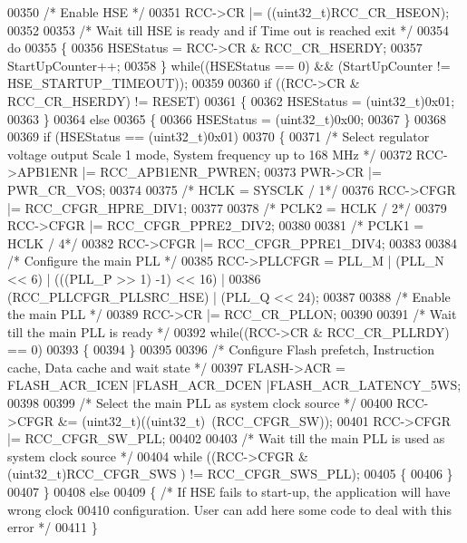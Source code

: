 \begin{DoxyCode}
00350   \textcolor{comment}{/* Enable HSE */}
00351   RCC->CR |= ((uint32\_t)RCC_CR_HSEON);
00352 
00353   \textcolor{comment}{/* Wait till HSE is ready and if Time out is reached exit */}
00354   \textcolor{keywordflow}{do}
00355   \{
00356     HSEStatus = RCC->CR & RCC_CR_HSERDY;
00357     StartUpCounter++;
00358   \} \textcolor{keywordflow}{while}((HSEStatus == 0) && (StartUpCounter != HSE_STARTUP_TIMEOUT));
00359 
00360   \textcolor{keywordflow}{if} ((RCC->CR & RCC_CR_HSERDY) != RESET)
00361   \{
00362     HSEStatus = (uint32\_t)0x01;
00363   \}
00364   \textcolor{keywordflow}{else}
00365   \{
00366     HSEStatus = (uint32\_t)0x00;
00367   \}
00368 
00369   \textcolor{keywordflow}{if} (HSEStatus == (uint32\_t)0x01)
00370   \{
00371     \textcolor{comment}{/* Select regulator voltage output Scale 1 mode, System frequency up to 168 MHz */}
00372     RCC->APB1ENR |= RCC_APB1ENR_PWREN;
00373     PWR->CR |= PWR_CR_VOS;
00374 
00375     \textcolor{comment}{/* HCLK = SYSCLK / 1*/}
00376     RCC->CFGR |= RCC_CFGR_HPRE_DIV1;
00377 
00378     \textcolor{comment}{/* PCLK2 = HCLK / 2*/}
00379     RCC->CFGR |= RCC_CFGR_PPRE2_DIV2;
00380 
00381     \textcolor{comment}{/* PCLK1 = HCLK / 4*/}
00382     RCC->CFGR |= RCC_CFGR_PPRE1_DIV4;
00383 
00384     \textcolor{comment}{/* Configure the main PLL */}
00385     RCC->PLLCFGR = PLL_M | (PLL_N << 6) | (((PLL_P >> 1) -1) << 16) |
00386                    (RCC_PLLCFGR_PLLSRC_HSE) | (PLL_Q << 24);
00387 
00388     \textcolor{comment}{/* Enable the main PLL */}
00389     RCC->CR |= RCC_CR_PLLON;
00390 
00391     \textcolor{comment}{/* Wait till the main PLL is ready */}
00392     \textcolor{keywordflow}{while}((RCC->CR & RCC_CR_PLLRDY) == 0)
00393     \{
00394     \}
00395 
00396     \textcolor{comment}{/* Configure Flash prefetch, Instruction cache, Data cache and wait state */}
00397     FLASH->ACR = FLASH_ACR_ICEN |FLASH_ACR_DCEN |FLASH_ACR_LATENCY_5WS;
00398 
00399     \textcolor{comment}{/* Select the main PLL as system clock source */}
00400     RCC->CFGR &= (uint32\_t)((uint32\_t)~(RCC_CFGR_SW));
00401     RCC->CFGR |= RCC_CFGR_SW_PLL;
00402 
00403     \textcolor{comment}{/* Wait till the main PLL is used as system clock source */}
00404     \textcolor{keywordflow}{while} ((RCC->CFGR & (uint32\_t)RCC_CFGR_SWS ) != RCC_CFGR_SWS_PLL);
00405     \{
00406     \}
00407   \}
00408   \textcolor{keywordflow}{else}
00409   \{ \textcolor{comment}{/* If HSE fails to start-up, the application will have wrong clock}
00410 \textcolor{comment}{         configuration. User can add here some code to deal with this error */}
00411   \}

\end{DoxyCode}
